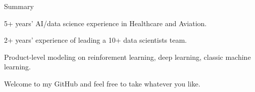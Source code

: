 \documentclass{resume} %
\begin{document}

\begin{rSection}{Summary}

\begin{rSubsection}{}{}{}{}
\item 5+ years' AI/data science experience in Healthcare and Aviation.
\item 2+ years' experience of leading a 10+ data scientists team.
\item Product-level modeling on reinforement learning, deep learning, classic machine learning.
\item Welcome to my GitHub and feel free to take whatever you like.
\end{rSubsection}


\end{rSection}

\end{document}
